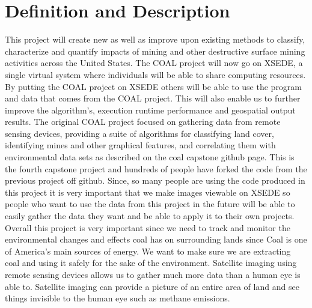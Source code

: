 \documentclass{article}
\begin{document}
\newpage
\section*{Definition and Description}
This project will create new as well as improve upon existing methods to
classify, characterize
and quantify impacts of mining and other destructive surface mining activities
across the United States. The COAL project will now go on XSEDE, a single
virtual system where individuals will be able to share computing resources. By
putting the COAL project on XSEDE others will be able to use the program and
data that comes from the COAL project. This will also enable us to further
improve the algorithm's, execution runtime performance and geospatial output
results. The original COAL project focused on gathering data from remote
sensing devices, providing a suite of algorithms for classifying land cover,
identifying mines and other graphical features, and correlating them with
environmental data sets as described on the coal capstone github page.
\newline
This is the fourth capstone project and hundreds of people have forked the code
from the previous project off github. Since, so many people are using the code
produced in this project it is very important that we make images viewable on
XSEDE so people who want to use the data from this project in the future will
be able to easily gather the data they want and be able to apply it to their
own projects.
\newline
Overall this project is very important since we need to track and monitor the
environmental changes and effects coal has on surrounding lands since Coal is
one of America's main sources of energy. We want to make sure we are extracting
coal and using it safely for the sake of the environment. Satellite imaging
using remote sensing devices allows us to gather much more data than a human
eye is able to. Satellite imaging can provide a picture of an entire area of
land and see things invisible to the human eye such as methane emissions.


\end{document}
